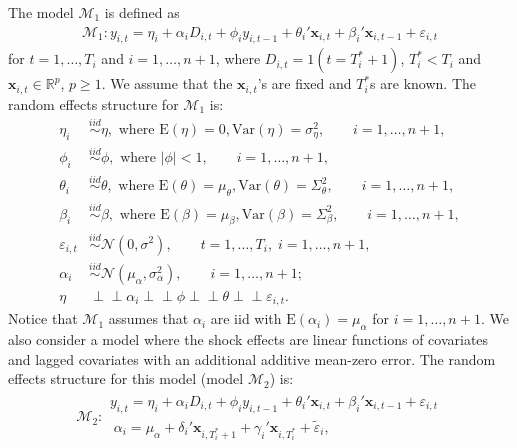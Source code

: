 \documentclass[11pt]{article}
\newcommand{\R}{\mathbb{R}}
\newcommand{\x}{\textbf{x}}
\def\mbf#1{\mathbf{#1}} %
\newcommand{\simiid}{\stackrel{iid}{\sim}} %
\def\where{\text{ where }} %
\newcommand{\indep}{\perp \!\!\! \perp } %
\def\t#1{\tilde{#1}} %
\def\normal#1#2{\mathcal{N}(#1,#2)} %
\def\mc#1{\mathcal{#1}} %
\def\E#1{\mathrm{E}(#1)} %
\def\var#1{\mathrm{Var}(#1)} %
\theoremstyle{definition}
\begin{document}
The model $\mc{M}_1$ is defined as
\begin{align}
\mc{M}_1 \colon y_{i,t} =\eta_i +\alpha_i D_{i,t} + \phi_i y_{i, t-1} + \theta_i'\mbf{x}_{i,t}+ \beta_i'\mbf{x}_{i, t-1} + \varepsilon_{i,t}\label{equation1}
\end{align}
for $t = 1,\ldots,T_i$ and $i = 1,\ldots, n+1$, where $D_{i,t} = 1(t = T_i^* + 1)$, 
$T_i^* < T_i$ and $\x_{i,t} \in \R^{p}$, $p \geq 1$.  We assume that the 
$\mbf{x}_{i,t}$'s are fixed and $T_i^*$s are known. The random effects structure for $\mc{M}_1$ is:
\begin{align*}
  \eta_i &\simiid  \eta ,\where \E{\eta} = 0, \var{\eta} = \sigma^2_{\eta}, \qquad i = 1, \ldots, n+1,\\
  \phi_i &\simiid \phi, \where |\phi|<1, \qquad i = 1, \ldots, n+1, \\
   \theta_i &\simiid \theta, \where \E{\theta}=\mu_{\theta}, \var{\theta}=\Sigma_{\theta}^2, \qquad i = 1, \ldots, n + 1, \\
\beta_i &\simiid \beta, \where \E{\beta}=\mu_{\beta}, \var{\beta}=\Sigma_{\beta}^2, \qquad i = 1, \ldots, n+1,\\
\varepsilon_{i,t} &\simiid \normal{0}{\sigma^2}, \qquad t=1, \ldots, T_i, \; i = 1, \ldots, n+1,\\
\alpha_i &\simiid  \normal{\mu_{\alpha}}{\sigma^2_{\alpha}}, \qquad  i = 1, \ldots, n+1; \\
\eta &\indep  \alpha_i \indep \phi \indep \theta \indep \varepsilon_{i,t}.
\end{align*}
Notice that $\mc{M}_1$ assumes that $\alpha_i$ are iid with $\E{\alpha_i}=\mu_{\alpha}$ 
for $i = 1, \ldots, n+1$.  %
We also consider a model where the shock effects are linear functions of covariates and 
lagged covariates with an additional additive mean-zero error.
The random effects structure for this model (model $\mc{M}_2$) is:
\begin{align}
\mc{M}_2 \colon \begin{array}{l}
  y_{i,t} =\eta_i +\alpha_i D_{i,t} + \phi_i y_{i, t-1} + \theta_i'\mbf{x}_{i,t}+ \beta_i'\mbf{x}_{i, t-1} + \varepsilon_{i,t}\\[.2cm]
  \; \alpha_i = \mu_{\alpha}+\delta_{i}'\mbf{x}_{i, T_i^*+1}+\gamma_i'\mbf{x}_{i, T^*_i}+\t{\varepsilon}_{i},
\end{array}\label{model2}
\end{align}
\end{document}
